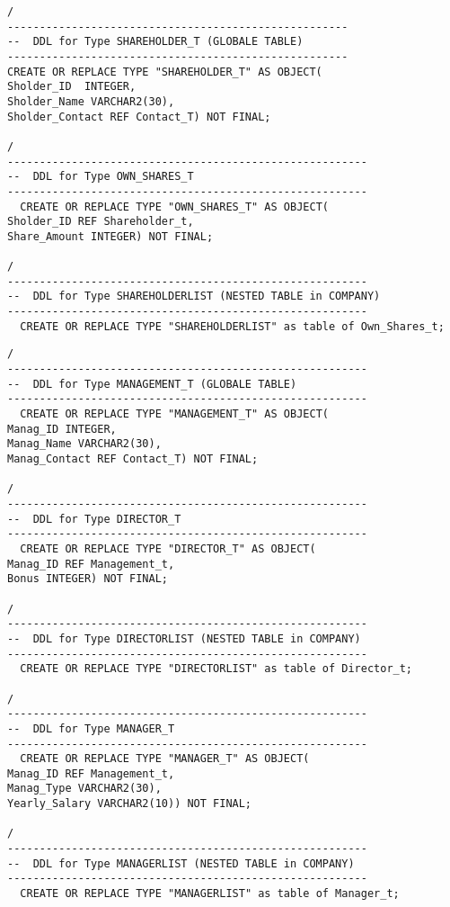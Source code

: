 \documentclass{scrartcl}
\begin{document}
\begin{lstlisting}
/
-----------------------------------------------------
--  DDL for Type SHAREHOLDER_T (GLOBALE TABLE)
-----------------------------------------------------
CREATE OR REPLACE TYPE "SHAREHOLDER_T" AS OBJECT(
Sholder_ID  INTEGER,
Sholder_Name VARCHAR2(30),
Sholder_Contact REF Contact_T) NOT FINAL;

/
--------------------------------------------------------
--  DDL for Type OWN_SHARES_T 
--------------------------------------------------------
  CREATE OR REPLACE TYPE "OWN_SHARES_T" AS OBJECT(
Sholder_ID REF Shareholder_t,
Share_Amount INTEGER) NOT FINAL;

/
--------------------------------------------------------
--  DDL for Type SHAREHOLDERLIST (NESTED TABLE in COMPANY)
--------------------------------------------------------
  CREATE OR REPLACE TYPE "SHAREHOLDERLIST" as table of Own_Shares_t;
\end{lstlisting}

\begin{lstlisting}
/
--------------------------------------------------------
--  DDL for Type MANAGEMENT_T (GLOBALE TABLE)
--------------------------------------------------------
  CREATE OR REPLACE TYPE "MANAGEMENT_T" AS OBJECT(
Manag_ID INTEGER,
Manag_Name VARCHAR2(30),
Manag_Contact REF Contact_T) NOT FINAL;

/
--------------------------------------------------------
--  DDL for Type DIRECTOR_T
--------------------------------------------------------
  CREATE OR REPLACE TYPE "DIRECTOR_T" AS OBJECT(
Manag_ID REF Management_t,
Bonus INTEGER) NOT FINAL;

/
--------------------------------------------------------
--  DDL for Type DIRECTORLIST (NESTED TABLE in COMPANY)
--------------------------------------------------------
  CREATE OR REPLACE TYPE "DIRECTORLIST" as table of Director_t;

/
--------------------------------------------------------
--  DDL for Type MANAGER_T
--------------------------------------------------------
  CREATE OR REPLACE TYPE "MANAGER_T" AS OBJECT(
Manag_ID REF Management_t, 
Manag_Type VARCHAR2(30),
Yearly_Salary VARCHAR2(10)) NOT FINAL;

/
--------------------------------------------------------
--  DDL for Type MANAGERLIST (NESTED TABLE in COMPANY)
--------------------------------------------------------
  CREATE OR REPLACE TYPE "MANAGERLIST" as table of Manager_t;
\end{lstlisting}
\end{document}
